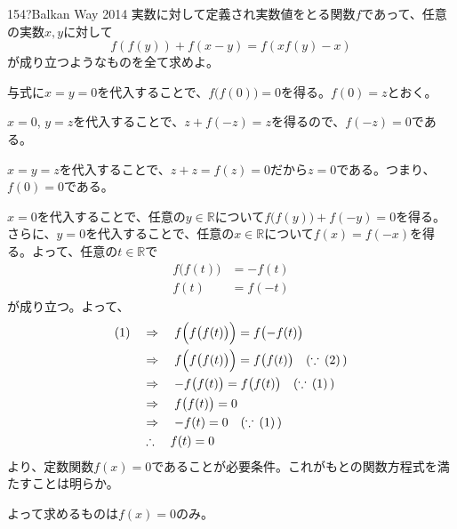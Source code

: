 \begin{prob}{154}{\hosi ?}{Balkan Way 2014}
 実数に対して定義され実数値をとる関数$f$であって、任意の実数$x, y$に対して
 \[ f\left(f(y)\right)+f(x-y)=f\left(xf(y)-x\right) \]
 が成り立つようなものを全て求めよ。
\end{prob}
与式に$x=y=0$を代入することで、$f\bigl(f(0)\bigr)=0$を得る。$f(0)=z$とおく。

$x=0$, $y=z$を代入することで、$z+f(-z)=z$を得るので、$f(-z)=0$である。

$x=y=z$を代入することで、$z+z=f(z)=0$だから$z=0$である。つまり、$f(0)=0$である。

$x=0$を代入することで、任意の$y\in\mathbb{R}$について$f\bigl(f(y)\bigr)+f(-y)=0$を得る。さらに、$y=0$を代入することで、任意の$x\in\mathbb{R}$について$f(x)=f(-x)$を得る。よって、任意の$t\in\mathbb{R}$で
\begin{align*}
 f\bigl(f(t)\bigr)&=-f(t) \\
 f(t)&=f(-t)
\end{align*}
が成り立つ。よって、
\begin{align*}
 \text{(1)} \quad &\Rightarrow \quad f\Bigl(f\bigl(f(t)\bigr)\Bigr)=f\bigl(-f(t)\bigr) \\
 &\Rightarrow \quad f\Bigl(f\bigl(f(t)\bigr)\Bigr)=f\bigl(f(t)\bigr) \quad (\because\, (2)\, )\\
 &\Rightarrow \quad -f\bigl(f(t)\bigr)=f\bigl(f(t)\bigr) \quad (\because\, (1)\, ) \\
 &\Rightarrow \quad f\bigl(f(t)\bigr)=0 \\
 &\Rightarrow \quad -f(t)=0 \quad (\because\, (1)\, ) \\
 &\therefore \quad f(t)=0
\end{align*}
より、定数関数$f(x)=0$であることが必要条件。これがもとの関数方程式を満たすことは明らか。

よって求めるものは$f(x)=0$のみ。